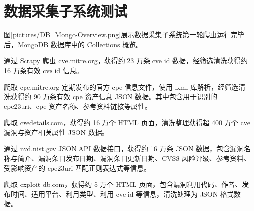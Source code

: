 \documentclass[a4paper,AutoFakeBold,oneside,12pt]{book}
\begin{document}
\section{数据采集子系统测试}

图\ref{pictures/DB_Mongo-Overview.png}展示数据采集子系统第一轮爬虫运行完毕后，MongoDB 数据库中的 Collections 概览。


通过 Scrapy 爬虫 cve.mitre.org，获得约 23 万条 cve id 数据，经筛选清洗获得约 16 万条有效 cve id 信息。%


爬取 cpe.mitre.org 定期发布的官方 cpe 信息文件，使用 lxml 库解析，经筛选清洗获得约 90 万条有效 cpe 资产信息 JSON 数据。其中包含用于识别的 cpe23uri、cpe 资产名称、参考资料链接等属性。%


爬取 cvedetails.com，获得约 16 万个 HTML 页面，清洗整理获得超 400 万个 cve 漏洞与资产相关属性 JSON 数据。%


通过 nvd.nist.gov JSON API 数据接口，获得约 16 万条 JSON 数据，包含漏洞名称与简介、漏洞条目发布日期、漏洞条目更新日期、CVSS 风险评级、参考资料、受影响资产的 cpe23uri 匹配正则表达式等信息。%


爬取 exploit-db.com，获得约 5 万个 HTML 页面，包含漏洞利用代码、作者、发布时间、适用平台、利用类型、利用 cve id 等信息，清洗处理为 JSON 格式数据。%


\end{document}
